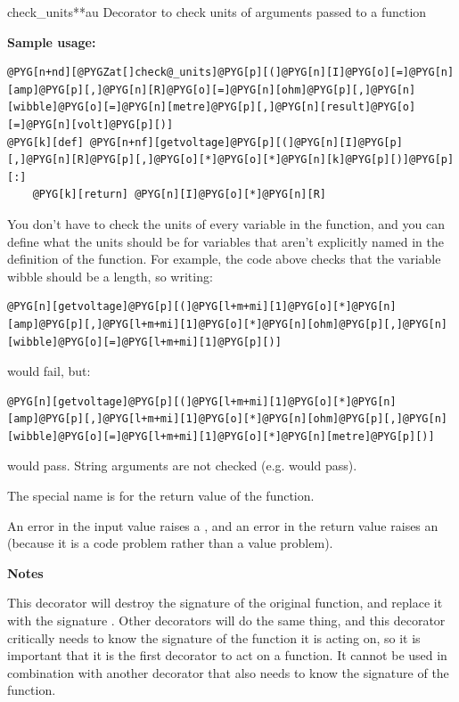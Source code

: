 \documentclass[letterpaper,10pt,english]{manual}
\begin{document}
\hypertarget{brian.check_units}{}\begin{funcdesc}{check\_units}{**au}
Decorator to check units of arguments passed to a function

\textbf{Sample usage:}

\begin{Verbatim}[commandchars=@\[\]]
@PYG[n+nd][@PYGZat[]check@_units]@PYG[p][(]@PYG[n][I]@PYG[o][=]@PYG[n][amp]@PYG[p][,]@PYG[n][R]@PYG[o][=]@PYG[n][ohm]@PYG[p][,]@PYG[n][wibble]@PYG[o][=]@PYG[n][metre]@PYG[p][,]@PYG[n][result]@PYG[o][=]@PYG[n][volt]@PYG[p][)]
@PYG[k][def] @PYG[n+nf][getvoltage]@PYG[p][(]@PYG[n][I]@PYG[p][,]@PYG[n][R]@PYG[p][,]@PYG[o][*]@PYG[o][*]@PYG[n][k]@PYG[p][)]@PYG[p][:]
    @PYG[k][return] @PYG[n][I]@PYG[o][*]@PYG[n][R]
\end{Verbatim}

You don't have to check the units of every variable in the function, and
you can define what the units should be for variables that aren't
explicitly named in the definition of the function. For example, the code
above checks that the variable wibble should be a length, so writing:

\begin{Verbatim}[commandchars=@\[\]]
@PYG[n][getvoltage]@PYG[p][(]@PYG[l+m+mi][1]@PYG[o][*]@PYG[n][amp]@PYG[p][,]@PYG[l+m+mi][1]@PYG[o][*]@PYG[n][ohm]@PYG[p][,]@PYG[n][wibble]@PYG[o][=]@PYG[l+m+mi][1]@PYG[p][)]
\end{Verbatim}

would fail, but:

\begin{Verbatim}[commandchars=@\[\]]
@PYG[n][getvoltage]@PYG[p][(]@PYG[l+m+mi][1]@PYG[o][*]@PYG[n][amp]@PYG[p][,]@PYG[l+m+mi][1]@PYG[o][*]@PYG[n][ohm]@PYG[p][,]@PYG[n][wibble]@PYG[o][=]@PYG[l+m+mi][1]@PYG[o][*]@PYG[n][metre]@PYG[p][)]
\end{Verbatim}

would pass.
String arguments are not checked (e.g.  would pass).

The special name  is for the return value of the function.

An error in the input value raises a \hyperlink{brian.DimensionMismatchError}{}, and an error
in the return value raises an  (because it is a code
problem rather than a value problem).

\textbf{Notes}

This decorator will destroy the signature of the original function, and
replace it with the signature . Other decorators will
do the same thing, and this decorator critically needs to know the signature
of the function it is acting on, so it is important that it is the first
decorator to act on a function. It cannot be used in combination with another
decorator that also needs to know the signature of the function.
\end{funcdesc}
\end{document}
